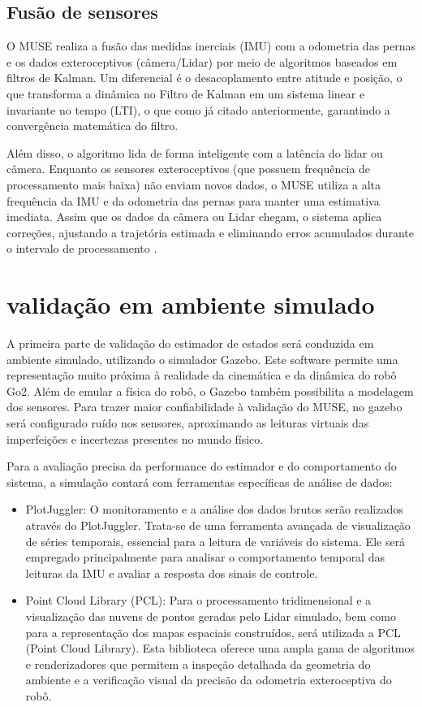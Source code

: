 \subsection{Fusão de sensores}
O MUSE realiza a fusão das medidas inerciais (IMU) com a odometria das pernas e 
os dados exteroceptivos (câmera/Lidar) por meio de algoritmos baseados em filtros 
de Kalman. Um diferencial é o desacoplamento entre 
atitude e posição, o que transforma a dinâmica no Filtro de Kalman em um sistema 
linear e invariante no tempo (LTI), o que como já citado anteriormente, garantindo a convergência matemática do filtro.

Além disso, o algoritmo lida de forma inteligente com a latência do lidar ou 
câmera. Enquanto os sensores exteroceptivos (que possuem frequência de 
processamento mais baixa) não enviam novos dados, o MUSE utiliza a alta frequência
da IMU e da odometria das pernas para manter uma estimativa imediata. Assim que os 
dados da câmera ou Lidar chegam, o sistema aplica correções, 
ajustando a trajetória estimada e eliminando erros acumulados durante o intervalo
de processamento \cite{nistico2025muse}.

\section{validação em ambiente simulado}
A primeira parte de validação do estimador de estados será conduzida em ambiente 
simulado, utilizando o simulador Gazebo. Este software permite uma representação
muito próxima à realidade da cinemática e da dinâmica do robô Go2. Além de 
emular a física do robô, o Gazebo também possibilita a modelagem dos sensores. 
Para trazer maior confiabilidade à validação do MUSE, no gazebo será configurado 
ruído nos sensores, aproximando as leituras virtuais das imperfeições e 
incertezas presentes no mundo físico.

Para a avaliação precisa da performance do estimador e do comportamento do 
sistema, a simulação contará com ferramentas específicas de análise de dados:

\begin{itemize}
    \item PlotJuggler: O monitoramento e a análise dos dados brutos serão 
    realizados através do PlotJuggler. Trata-se de uma ferramenta avançada de 
    visualização de séries temporais, essencial para a leitura de variáveis do 
    sistema. Ele será empregado principalmente para analisar o comportamento 
    temporal das leituras da IMU e avaliar a resposta dos sinais de controle.
    \item Point Cloud Library (PCL): Para o processamento tridimensional e a 
    visualização das nuvens de pontos geradas pelo Lidar simulado, bem como para 
    a representação  dos mapas espaciais construídos, será utilizada a PCL 
    (Point Cloud Library). Esta biblioteca oferece uma ampla gama de algoritmos e 
    renderizadores que permitem a inspeção detalhada da geometria do ambiente e a 
    verificação visual da precisão da odometria exteroceptiva do robô.
\end{itemize}

